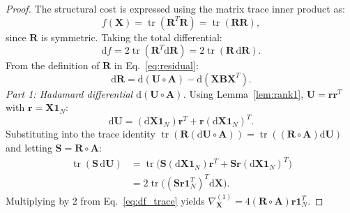 \documentclass[a4paper,fleqn]{cas-dc}
\theoremstyle{thmstyleone}
\theoremstyle{thmstyletwo}
\theoremstyle{thmstylethree}
\begin{document}
\begin{proof}
The structural cost is expressed using the matrix trace inner product as:
\begin{equation}
f(\mathbf{X}) = \operatorname{tr}(\mathbf{R}^T \mathbf{R}) = \operatorname{tr}(\mathbf{R}\mathbf{R}),
\end{equation}
since $\mathbf{R}$ is symmetric. Taking the total differential:
\begin{equation}
\mathrm{d}f = 2\operatorname{tr}(\mathbf{R}^T \mathrm{d}\mathbf{R}) = 2\operatorname{tr}(\mathbf{R} \, \mathrm{d}\mathbf{R}).
\label{eq:df_trace}
\end{equation}
From the definition of $\mathbf{R}$ in Eq.~\eqref{eq:residual}:
\begin{equation}
\mathrm{d}\mathbf{R} = \mathrm{d}(\mathbf{U} \circ \mathbf{A}) - \mathrm{d}(\mathbf{X}\mathbf{B}\mathbf{X}^T).
\label{eq:dR}
\end{equation}
\textit{Part 1: Hadamard differential $\mathrm{d}(\mathbf{U} \circ \mathbf{A})$.} Using Lemma~\ref{lem:rank1}, $\mathbf{U} = \mathbf{r}\mathbf{r}^T$ with $\mathbf{r} = \mathbf{X}\mathbf{1}_N$:
\begin{equation}
\mathrm{d}\mathbf{U} = (\mathrm{d}\mathbf{X}\mathbf{1}_N)\mathbf{r}^T + \mathbf{r}(\mathrm{d}\mathbf{X}\mathbf{1}_N)^T.
\end{equation}
Substituting into the trace identity $\operatorname{tr}(\mathbf{R}(\mathrm{d}\mathbf{U} \circ \mathbf{A})) = \operatorname{tr}((\mathbf{R} \circ \mathbf{A})\mathrm{d}\mathbf{U})$ and letting $\mathbf{S} = \mathbf{R} \circ \mathbf{A}$:
\begin{align}
\operatorname{tr}(\mathbf{S} \, \mathrm{d}\mathbf{U}) &= \operatorname{tr}\big(\mathbf{S}(\mathrm{d}\mathbf{X}\mathbf{1}_N)\mathbf{r}^T + \mathbf{S}\mathbf{r}(\mathrm{d}\mathbf{X}\mathbf{1}_N)^T\big) \nonumber \\
&= 2\operatorname{tr}\big((\mathbf{S}\mathbf{r}\mathbf{1}_N^T)^T \mathrm{d}\mathbf{X}\big).
\end{align}
Multiplying by 2 from Eq.~\eqref{eq:df_trace} yields $\nabla_{\mathbf{X}}^{(1)} = 4(\mathbf{R} \circ \mathbf{A})\mathbf{r}\mathbf{1}_N^T$.


\end{proof}
\end{document}

